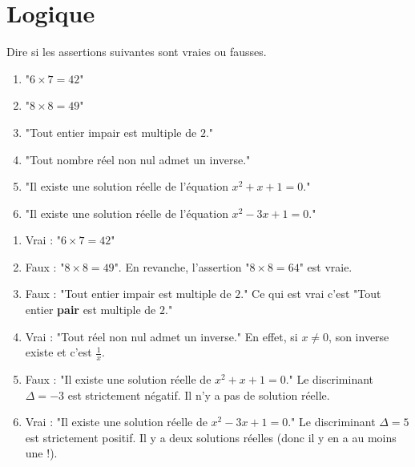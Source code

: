 \documentclass[11pt,class=report,crop=false]{standalone}
\begin{document}


\bigskip
\bigskip


\section{Logique}

\exercice{}
\enonce
Dire si les assertions suivantes sont vraies ou fausses.
 \begin{enumerate}
      \item "$6\times 7 = 42$"
      \item "$8 \times 8 = 49$"
      \item "Tout entier impair est multiple de $2$."
      \item "Tout nombre réel non nul admet un inverse."
      \item "Il existe une solution réelle de l'équation $x^2+x+1=0$."
      \item "Il existe une solution réelle de l'équation $x^2-3x+1=0$." 
\end{enumerate} 
\finenonce

\noindication

\correction
\sauteligne
 \begin{enumerate}
     
    \item Vrai : "$6\times 7 = 42$"
    
    \item Faux : "$8 \times 8 = 49$". En revanche, l'assertion "$8 \times 8 = 64$" est vraie.
    
    \item Faux : "Tout entier impair est multiple de $2$." Ce qui est vrai c'est "Tout entier \textbf{pair} est multiple de $2$."
    
    \item Vrai : "Tout réel non nul admet un inverse." En effet, si $x \neq 0$, son inverse existe et c'est $\frac1x$.
    
    \item Faux : "Il existe une solution réelle de $x^2+x+1=0$." Le discriminant $\Delta = -3$ est strictement négatif. Il n'y a pas de solution réelle.
    
    \item Vrai : "Il existe une solution réelle de $x^2-3x+1=0$." Le discriminant $\Delta = 5$ est strictement positif. Il y a deux solutions réelles (donc il y en a au moins une !).
    
\end{enumerate} 
\fincorrection
\finexercice
\end{document}

